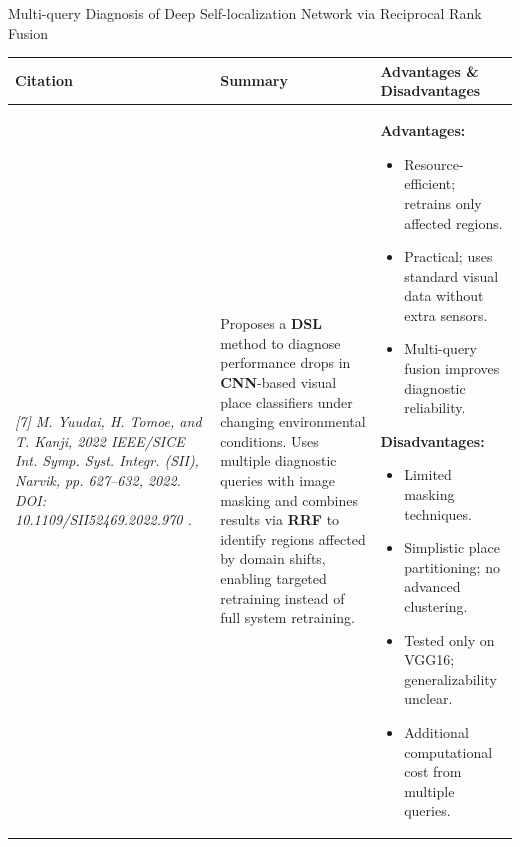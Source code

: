 \begin{frame}{Multi-query Diagnosis of Deep Self-localization Network via Reciprocal Rank Fusion}
\scriptsize
\vspace{-0.8em}

\begin{table}[h!]
\centering
\renewcommand{\arraystretch}{1.5} %
\setlength{\tabcolsep}{2.5pt}     %

\begin{tabular}{|p{2.6cm}|p{4.3cm}|p{4.3cm}|}
\hline
\textbf{Citation} & \textbf{Summary} & \textbf{Advantages \& Disadvantages} \\
\hline
\tiny\textit{[7] M. Yuudai, H. Tomoe, and T. Kanji, 2022 IEEE/SICE Int. Symp. Syst. Integr. (SII), Narvik, pp. 627–632, 2022.
DOI: 10.1109/SII52469.2022.970 \newline 8609.}
&
Proposes a \textbf{DSL} method to diagnose performance drops in \textbf{CNN}-based visual place classifiers under changing environmental conditions. Uses multiple diagnostic queries with image masking and combines results via \textbf{RRF} to identify regions affected by domain shifts, enabling targeted retraining instead of full system retraining.
&
\textbf{Advantages:}
\begin{itemize}\itemsep0.25em
\item Resource-efficient; retrains only affected regions.
\item Practical; uses standard visual data without extra sensors.
\item Multi-query fusion improves diagnostic reliability.
\end{itemize}

\textbf{Disadvantages:}
\begin{itemize}\itemsep0.25em
\item Limited masking techniques.
\item Simplistic place partitioning; no advanced clustering.
\item Tested only on VGG16; generalizability unclear.
\item Additional computational cost from multiple queries.
\end{itemize} \\
\hline
\end{tabular}
\end{table}
\end{frame}
